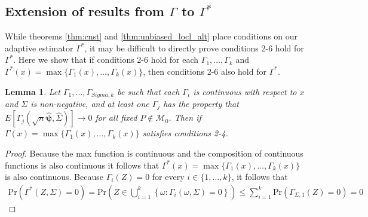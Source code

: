 \documentclass{article}
\newtheorem{lemma}[theorem]{Lemma}
\newcounter{conditions}
\begin{document}
\subsection{Extension of results from $\Gamma$ to $\Gamma^*$}

While theorems \ref{thm:cnst} and \ref{thm:unbiased_locl_alt} place conditions on our adaptive estimator $\Gamma^*$, it may be difficult to directly prove conditions 2-6 hold for $\Gamma^*$.  Here we show that if conditions 2-6 hold for each $\Gamma_1, \dots, \Gamma_k$ and $\Gamma^*(x) = \max\{\Gamma_{1}(x), \dots, \Gamma_{k}(x)\}$, then conditions 2-6 also hold for $\Gamma^*$.

\begin{lemma}
	Let $\Gamma_{1}, \dots, \Gamma_{Sigma, k}$ be such that each $\Gamma_{i}$ is continuous with respect to $x$ and $\Sigma$ is non-negative, and  at least one $\Gamma_{j}$ has the property that $E\left[\Gamma_{j}(\sqrt{n}\hat{\boldsymbol{\psi}}, \hat{\Sigma})\right] \rightarrow 0$ for all fixed $P \not \in \mathcal{M}_0$.  Then if $\Gamma(x) = \max\{\Gamma_{1}(x), \dots, \Gamma_{k}(x)\}$ satisfies conditions 2-4.
\end{lemma}

\begin{proof}
	Because the max function is continuous and the composition of continuous functions is also continuous it follows that $\Gamma^*(x) = \max\{\Gamma_{1}(x), \dots, \Gamma_{k}(x)\}$ is also continuous.  
	Because $\Gamma_{i}(Z) = 0$ for every $i \in \{1, \dots, k\}$, it follows that 
	\begin{align*}
		\text{Pr}(\Gamma^*(Z, \Sigma) = 0) = \text{Pr}\left(Z \in \bigcup_{i = 1}^k \left\{ \omega : \Gamma_{i}(\omega, \Sigma) = 0 \right\} \right) \leq \sum_{i = 1}^k \text{Pr}(\Gamma_{\Sigma, 1}(Z) = 0) = 0 
	\end{align*}
\end{proof}
\end{document}
